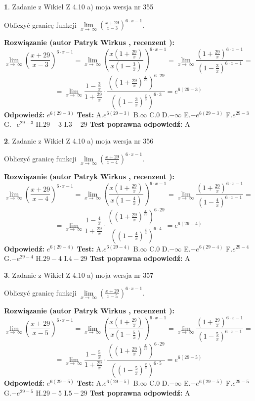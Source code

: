 \documentclass[12pt, a4paper]{article}
\theoremstyle{definition} %
\newtheorem{zad}{}
\newcommand{\zadStart}[1]{\begin{zad}#1\newline}
\newcommand{\zadStop}{\end{zad}}
\newcommand{\rozwStart}[2]{\noindent \textbf{Rozwiązanie (autor #1 , recenzent #2): }\newline}
\newcommand{\rozwStop}{\newline}
\newcommand{\odpStart}{\noindent \textbf{Odpowiedź:}\newline}
\newcommand{\odpStop}{\newline}
\newcommand{\testStart}{\noindent \textbf{Test:}\newline}
\newcommand{\testStop}{\newline}
\newcommand{\kluczStart}{\noindent \textbf{Test poprawna odpowiedź:}\newline}
\newcommand{\kluczStop}{\newline}
\begin{document}
\zadStart{Zadanie z Wikieł Z 4.10 a) moja wersja nr 355}


Obliczyć granicę funkcji  $\lim\limits_{x\to\ \infty}(\frac{x+29}{x-3})^{6\cdot x-1}$.
\zadStop
\rozwStart{Patryk Wirkus}{}
$$\lim\limits_{x\to\ \infty}(\frac{x+29}{x-3})^{6\cdot x-1} = \lim\limits_{x\to\ \infty}(\frac{x(1+\frac{29}{x})}{x(1-\frac{3}{x})})^{6\cdot x-1}=\lim\limits_{x\to\ \infty}\frac{(1+\frac{29}{x})^{6\cdot x-1}}{(1-\frac{3}{x})^{6\cdot x-1}}=$$
$$=\lim\limits_{x\to\ \infty}\frac{1-\frac{3}{x}}{1+\frac{29}{x}}\cdot\frac{((1+\frac{29}{x})^{\frac{x}{29}})^{6\cdot29}}{((1-\frac{3}{x})^{\frac{x}{3}})^{6\cdot3}}=e^{6(29-3)}$$
\rozwStop
\odpStart
$e^{6(29-3)}$
\odpStop
\testStart
A.$e^{6(29-3)}$ B.$\infty$ C.$0$ D.$-\infty$ E.$-e^{6(29-3)}$
F.$e^{29-3}$ G.$-e^{29-3}$
H.$29-3$
I.$3-29$
\testStop
\kluczStart
A
\kluczStop



\zadStart{Zadanie z Wikieł Z 4.10 a) moja wersja nr 356}


Obliczyć granicę funkcji  $\lim\limits_{x\to\ \infty}(\frac{x+29}{x-4})^{6\cdot x-1}$.
\zadStop
\rozwStart{Patryk Wirkus}{}
$$\lim\limits_{x\to\ \infty}(\frac{x+29}{x-4})^{6\cdot x-1} = \lim\limits_{x\to\ \infty}(\frac{x(1+\frac{29}{x})}{x(1-\frac{4}{x})})^{6\cdot x-1}=\lim\limits_{x\to\ \infty}\frac{(1+\frac{29}{x})^{6\cdot x-1}}{(1-\frac{4}{x})^{6\cdot x-1}}=$$
$$=\lim\limits_{x\to\ \infty}\frac{1-\frac{4}{x}}{1+\frac{29}{x}}\cdot\frac{((1+\frac{29}{x})^{\frac{x}{29}})^{6\cdot29}}{((1-\frac{4}{x})^{\frac{x}{4}})^{6\cdot4}}=e^{6(29-4)}$$
\rozwStop
\odpStart
$e^{6(29-4)}$
\odpStop
\testStart
A.$e^{6(29-4)}$ B.$\infty$ C.$0$ D.$-\infty$ E.$-e^{6(29-4)}$
F.$e^{29-4}$ G.$-e^{29-4}$
H.$29-4$
I.$4-29$
\testStop
\kluczStart
A
\kluczStop



\zadStart{Zadanie z Wikieł Z 4.10 a) moja wersja nr 357}


Obliczyć granicę funkcji  $\lim\limits_{x\to\ \infty}(\frac{x+29}{x-5})^{6\cdot x-1}$.
\zadStop
\rozwStart{Patryk Wirkus}{}
$$\lim\limits_{x\to\ \infty}(\frac{x+29}{x-5})^{6\cdot x-1} = \lim\limits_{x\to\ \infty}(\frac{x(1+\frac{29}{x})}{x(1-\frac{5}{x})})^{6\cdot x-1}=\lim\limits_{x\to\ \infty}\frac{(1+\frac{29}{x})^{6\cdot x-1}}{(1-\frac{5}{x})^{6\cdot x-1}}=$$
$$=\lim\limits_{x\to\ \infty}\frac{1-\frac{5}{x}}{1+\frac{29}{x}}\cdot\frac{((1+\frac{29}{x})^{\frac{x}{29}})^{6\cdot29}}{((1-\frac{5}{x})^{\frac{x}{5}})^{6\cdot5}}=e^{6(29-5)}$$
\rozwStop
\odpStart
$e^{6(29-5)}$
\odpStop
\testStart
A.$e^{6(29-5)}$ B.$\infty$ C.$0$ D.$-\infty$ E.$-e^{6(29-5)}$
F.$e^{29-5}$ G.$-e^{29-5}$
H.$29-5$
I.$5-29$
\testStop
\kluczStart
A
\kluczStop
\end{document}
